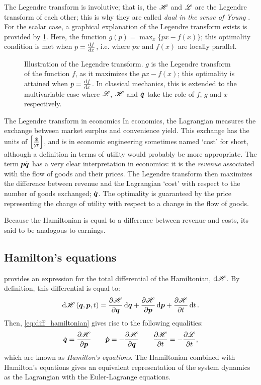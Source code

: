 The Legendre transform is involutive; that is, the $\mathscr{H}$ and $\mathscr{L}$ are the Legendre transform of each other; this is why they are called \emph{dual in the sense of Young} \cite{Arnold1989}. For the scalar case, a graphical explanation of the Legendre transform exists is provided by \cref{fig:legendre_transform}. Here, the function $g(p) = \max_x \{px - f(x)\}$; this optimality condition is met when $p = \dv{f}{x}$, i.e. where $px$ and $f(x)$ are locally parallel.
\begin{figure}
    \centering
    
    \caption{Illustration of the Legendre transform. $g$ is the Legendre transform of the function $f$, as it maximizes the $px - f(x)$; this optimality is attained when $p = \dv{f}{x}$. In classical mechanics, this is extended to the multivariable case where $\mathscr{L}$, $\mathscr{H}$ and $\dot{\vb*{q}}$ take the role of $f$, $g$ and $x$ respectively.}
    \label{fig:legendre_transform}
\end{figure}

\begin{econ}{The Legendre transform in economics}
    In economics, the Lagrangian measures the exchange between market surplus and convenience yield. This exchange has the units of $\qty[\frac{\$}{\text{yr}}]$, and is in economic engineering sometimes named `cost' for short, although a definition in terms of utility would probably be more appropriate. The term $\vb*{p}\dot{\vb*{q}}$ has a very clear interpretation in economics: it is the \emph{revenue} associated with the flow of goods and their prices. The Legendre transform then maximizes the difference between revenue and the Lagrangian `cost' with respect to the number of goods exchanged; $\dot{\vb*{q}}$. The optimality is guaranteed by the price representing the change of utility with respect to a change in the flow of goods.

    Because the Hamiltonian is equal to a difference between revenue and costs, its said to be analogous to earnings.
\end{econ}

\subsection{Hamilton's equations}
 provides an expression for the total differential of the Hamiltonian, $\dd{\ensuremath{\mathscr{H}}}$. By definition, this differential is equal to:
$$ \dd{\ensuremath{\mathscr{H}}}(\vb*{q}, \vb*{p}, t) = \pdv{\ensuremath{\mathscr{H}}}{\ensuremath{\vb*{q}}}\dd{\ensuremath{\vb*{q}}} + \pdv{\ensuremath{\mathscr{H}}}{\ensuremath{\vb*{p}}}\dd{\ensuremath{\vb*{p}}} + \pdv{\ensuremath{\mathscr{H}}}{t}\dd{t}. $$
Then, \cref{eq:diff_hamiltonian} gives rise to the following equalities:
\begin{equation}
    \dot{\vb*{q}} = \pdv{\ensuremath{\mathscr{H}}}{\ensuremath{\vb*{p}}} \qquad \dot{\vb*{p}} = -\pdv{\ensuremath{\mathscr{H}}}{\ensuremath{\vb*{q}}} \qquad \pdv{\ensuremath{\mathscr{H}}}{t} = - \pdv{\ensuremath{\mathscr{L}}}{t},
    \label{eq:ham_eqs}
\end{equation}
which are known as \emph{Hamilton's equations}. The Hamiltonian combined with Hamilton's equations gives an equivalent representation of the system dynamics as the Lagrangian with the Euler-Lagrange equations.

